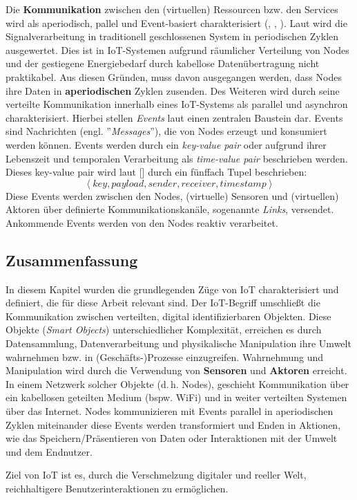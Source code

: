 Die \textbf{Kommunikation} zwischen den (virtuellen) Ressourcen bzw. den Services wird als aperiodisch, pallel und Event-basiert charakterisiert (\cite{serpanos2018iot}, \cite{laliwala2008event}, \cite{lan2014event}). Laut \cite{serpanos2018iot} wird die Signalverarbeitung in traditionell geschlossenen System in periodischen Zyklen ausgewertet. Dies ist in \ac{IoT}-Systemen aufgrund räumlicher Verteilung von Nodes und der gestiegene Energiebedarf durch kabellose Datenübertragung nicht praktikabel. Aus diesen Gründen, muss davon ausgegangen werden, dass Nodes ihre Daten in \textbf{aperiodischen} Zyklen zusenden. Des Weiteren wird durch seine verteilte Kommunikation innerhalb eines \ac{IoT}-Systems als parallel und asynchron charakterisiert. Hierbei stellen \textit{Events} laut \cite{serpanos2018iot} einen zentralen Baustein dar. Events sind Nachrichten (engl. ''\textit{Messages}''), die von Nodes erzeugt und konsumiert werden können. Events werden durch ein \textit{key-value pair} oder aufgrund ihrer Lebenszeit und temporalen Verarbeitung als \textit{time-value pair} beschrieben werden. Dieses key-value pair wird laut [\cite{serpanos2018iot}] durch ein fünffach Tupel beschrieben:
\begin{equation}
    \left \langle key, payload, sender, receiver, timestamp \right \rangle
\end{equation}
Diese Events werden zwischen den Nodes, (virtuelle) Sensoren und (virtuellen) Aktoren über definierte Kommunikationskanäle, sogenannte \textit{Links}, versendet. Ankommende Events werden von den Nodes reaktiv verarbeitet.

\subsection{Zusammenfassung}
In diesem Kapitel wurden die grundlegenden Züge von \ac{IoT} charakterisiert und definiert, die für diese Arbeit relevant sind. Der \ac{IoT}-Begriff umschließt die Kommunikation zwischen verteilten, digital identifizierbaren Objekten. Diese Objekte (\textit{Smart Objects}) unterschiedlicher Komplexität, erreichen es durch Datensammlung, Datenverarbeitung und physikalische Manipulation ihre Umwelt wahrnehmen bzw. in (Geschäfts-)Prozesse einzugreifen. Wahrnehmung und Manipulation wird durch die Verwendung von \textbf{Sensoren} und \textbf{Aktoren} erreicht. In einem Netzwerk solcher Objekte (d.\,h. Nodes), geschieht Kommunikation über ein kabellosen geteilten Medium (bspw. WiFi) und in weiter verteilten Systemen über das Internet. Nodes kommunizieren mit Events parallel in aperiodischen Zyklen miteinander diese Events werden transformiert und Enden in Aktionen, wie das Speichern/Präsentieren von Daten oder Interaktionen mit der Umwelt und dem Endnutzer.

Ziel von \ac{IoT} ist es, durch die Verschmelzung digitaler und reeller Welt, reichhaltigere Benutzerinteraktionen zu ermöglichen.
